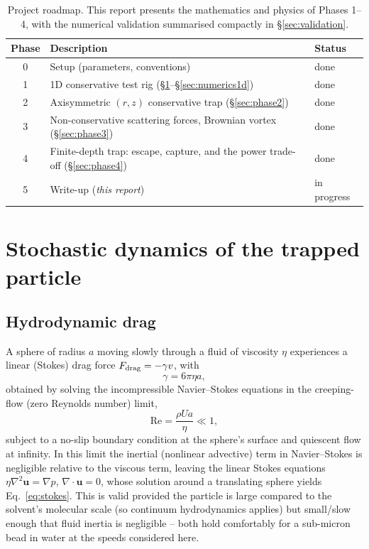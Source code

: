 \documentclass[11pt]{article}
\begin{document}
\begin{table}[h]
\centering
\begin{tabular}{@{}cll@{}}
\toprule
Phase & Description & Status \\
\midrule
0 & Setup (parameters, conventions) & done \\
1 & 1D conservative test rig (\S\ref{sec:langevin}--\S\ref{sec:numerics1d}) & done \\
2 & Axisymmetric $(r,z)$ conservative trap (\S\ref{sec:phase2}) & done \\
3 & Non-conservative scattering forces, Brownian vortex (\S\ref{sec:phase3}) & done \\
4 & Finite-depth trap: escape, capture, and the power trade-off (\S\ref{sec:phase4}) & done \\
5 & Write-up (\emph{this report}) & in progress \\
\bottomrule
\end{tabular}
\caption{Project roadmap. This report presents the mathematics and physics of Phases 1--4, with the numerical validation summarised compactly in \S\ref{sec:validation}.}
\label{tab:phases}
\end{table}

\section{Stochastic dynamics of the trapped particle}
\label{sec:langevin}

\subsection{Hydrodynamic drag}
\label{sec:drag}

A sphere of radius $a$ moving slowly through a fluid of viscosity $\eta$ experiences a linear (Stokes) drag force $F_{\rm drag} = -\gamma v$, with
\begin{equation}
\gamma = 6\pi \eta a,
\label{eq:stokes}
\end{equation}
obtained by solving the incompressible Navier--Stokes equations in the creeping-flow (zero Reynolds number) limit,
\begin{equation}
\mathrm{Re} = \frac{\rho U a}{\eta} \ll 1,
\end{equation}
subject to a no-slip boundary condition at the sphere's surface and quiescent flow at infinity. In this limit the inertial (nonlinear advective) term in Navier--Stokes is negligible relative to the viscous term, leaving the linear Stokes equations $\eta \nabla^2 \mathbf{u} = \nabla p$, $\nabla\cdot\mathbf{u}=0$, whose solution around a translating sphere yields Eq.~\eqref{eq:stokes}. This is valid provided the particle is large compared to the solvent's molecular scale (so continuum hydrodynamics applies) but small/slow enough that fluid inertia is negligible -- both hold comfortably for a sub-micron bead in water at the speeds considered here.
\end{document}
